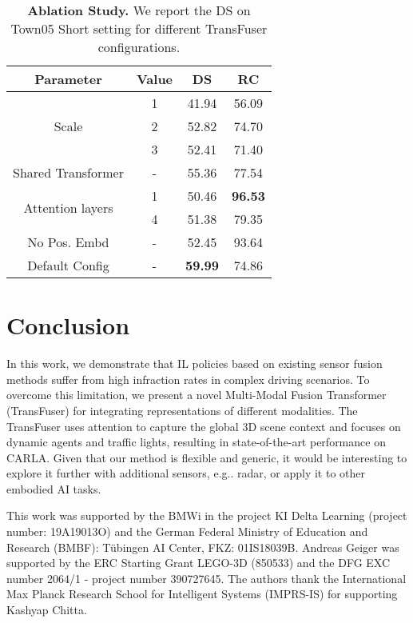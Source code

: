 \documentclass[final]{cvpr}
\makeatletter
\DeclareRobustCommand\onedot{\futurelet\@let@token\@onedot}
\def\@onedot{\ifx\@let@token.\else.\null\fi\xspace}
\def\eg{e.g\onedot} \def\Eg{E.g\onedot}
\newcommand{\boldparagraph}[1]{\vspace{0.1cm}\noindent{\bf #1:}}
\makeatother
\begin{document}
\begin{table}
    \small
    \setlength{\tabcolsep}{5pt}
    \centering
    \begin{tabular}{c| c | c c}
        Parameter & Value & DS  & RC \\
        \hline
        \multirow{3}{*}{Scale} & 1 & 41.94 & 56.09 \\
        & 2 & 52.82 & 74.70 \\
        & 3 & 52.41 & 71.40 \\
        \hline
        Shared Transformer & - & 55.36 & 77.54 \\
        \hline
        \multirow{2}{*}{Attention layers} & 1 & 50.46 & \textbf{96.53} \\
        & 4 & 51.38 & 79.35 \\
        \hline
        No Pos. Embd & - & 52.45 & 93.64 \\
        \hline
        Default Config & - & \textbf{59.99} & 74.86 \\
        \hline
    \end{tabular}
    \caption{\textbf{Ablation Study.} We report the DS on Town05 Short setting for different TransFuser configurations.}
    \label{tab:ablation}
    \vspace{-0.3cm}
\end{table}

















 \section{Conclusion}

In this work, we demonstrate that IL policies based on existing sensor fusion methods suffer from high infraction rates in complex driving scenarios. To overcome this limitation, we present a novel Multi-Modal Fusion Transformer (TransFuser) for integrating representations of different modalities. The TransFuser uses attention to capture the global 3D scene context and focuses on dynamic agents and traffic lights, resulting in state-of-the-art performance on CARLA. Given that our method is flexible and generic, it would be interesting to explore it further with additional sensors, \eg radar, or apply it to other embodied AI tasks.

\boldparagraph{Acknowledgements} This work was supported by the BMWi in the project KI Delta Learning (project number: 19A19013O) and the German Federal Ministry of Education and Research (BMBF): T\"ubingen AI Center, FKZ: 01IS18039B. Andreas Geiger was supported by the ERC Starting Grant LEGO-3D (850533) and the DFG EXC number 2064/1 - project number 390727645. The authors thank the International Max Planck Research School for Intelligent Systems (IMPRS-IS) for supporting Kashyap Chitta. 
{\small
	
	
}
\end{document}
